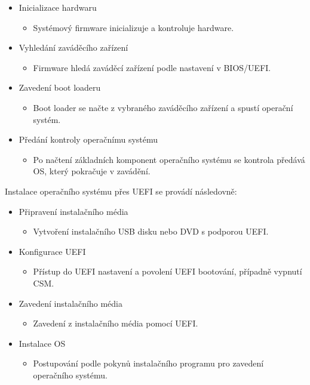 \begin{itemize}
\item Inicializace hardwaru
\begin{itemize}
\item Systémový firmware inicializuje a kontroluje hardware.
\end{itemize}
\item Vyhledání zaváděcího zařízení
\begin{itemize}
\item Firmware hledá zaváděcí zařízení podle nastavení v BIOS/UEFI.
\end{itemize}
\item Zavedení boot loaderu
\begin{itemize}
\item Boot loader se načte z vybraného zaváděcího zařízení a spustí operační systém.
\end{itemize}
\item Předání kontroly operačnímu systému
\begin{itemize}
\item Po načtení základních komponent operačního systému se kontrola předává OS, který pokračuje v zavádění.
\end{itemize}
\end{itemize}

Instalace operačního systému přes UEFI se provádí následovně:

\begin{itemize}
\item Připravení instalačního média
\begin{itemize}
\item Vytvoření instalačního USB disku nebo DVD s podporou UEFI.
\end{itemize}
\item Konfigurace UEFI
\begin{itemize}
\item Přístup do UEFI nastavení a povolení UEFI bootování, případně vypnutí CSM.
\end{itemize}
\item Zavedení instalačního média
\begin{itemize}
\item Zavedení z instalačního média pomocí UEFI.
\end{itemize}
\item Instalace OS
\begin{itemize}
\item Postupování podle pokynů instalačního programu pro zavedení operačního systému.
\end{itemize}
\end{itemize}